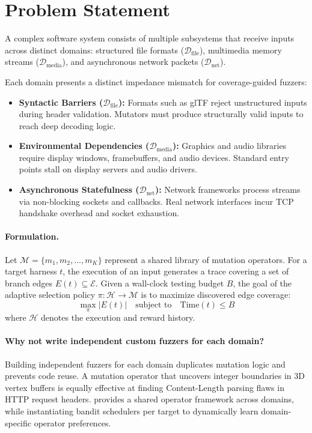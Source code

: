 \section{Problem Statement}
\label{sec:problem}

A complex software system consists of multiple subsystems that receive inputs across distinct domains:
structured file formats ($\mathcal{D}_{\text{file}}$),
multimedia memory streams ($\mathcal{D}_{\text{media}}$), and
asynchronous network packets ($\mathcal{D}_{\text{net}}$).

Each domain presents a distinct impedance mismatch for coverage-guided fuzzers:
\begin{itemize}
  \item \textbf{Syntactic Barriers ($\mathcal{D}_{\text{file}}$):} Formats such as glTF reject unstructured inputs during header validation. Mutators must produce structurally valid inputs to reach deep decoding logic.
  \item \textbf{Environmental Dependencies ($\mathcal{D}_{\text{media}}$):} Graphics and audio libraries require display windows, framebuffers, and audio devices. Standard entry points stall on display servers and audio drivers.
  \item \textbf{Asynchronous Statefulness ($\mathcal{D}_{\text{net}}$):} Network frameworks process streams via non-blocking sockets and callbacks. Real network interfaces incur TCP handshake overhead and socket exhaustion.
\end{itemize}

\paragraph{Formulation.}
Let $\mathcal{M} = \{m_1, m_2, \dots, m_K\}$ represent a shared library of mutation operators.
For a target harness $t$, the execution of an input generates a trace covering a set of branch edges $E(t) \subseteq \mathcal{E}$.
Given a wall-clock testing budget $B$, the goal of the adaptive selection policy $\pi: \mathcal{H} \to \mathcal{M}$ is to maximize discovered edge coverage:
\begin{equation}
\label{eq:goal}
\max_{\pi} |E(t)| \quad \text{subject to} \quad \text{Time}(t) \le B
\end{equation}
where $\mathcal{H}$ denotes the execution and reward history.

\paragraph{Why not write independent custom fuzzers for each domain?}
Building independent fuzzers for each domain duplicates mutation logic and prevents code reuse.
A mutation operator that uncovers integer boundaries in 3D vertex buffers is equally effective at finding Content-Length parsing flaws in HTTP request headers.
\tool provides a shared operator framework across domains, while instantiating bandit schedulers per target to dynamically learn domain-specific operator preferences.

